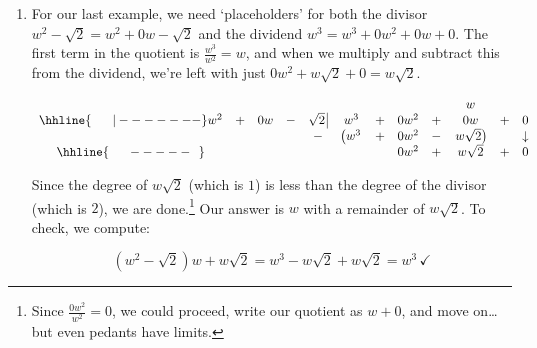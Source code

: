 {\begin{enumerate}
\item For our last example, we need `placeholders' for both the divisor  $w^2 - \sqrt{2} = w^2 + 0w -\sqrt{2}$ and the dividend $w^3 = w^3 + 0w^2 + 0w + 0$.  The first term in the quotient is $\frac{w^3}{w^2} = w$, and when we multiply and subtract this from the dividend, we're left with just $0w^2 + w\sqrt{2} + 0 = w\sqrt{2}$.

\setlength\arraycolsep{0.1pt}
\setlength\extrarowheight{2pt}

\[ \begin{array}{cccccccccccc}

    &   &    &   &                    &     &   &      &   &  w &   & \\ \hhline{~~~~~|-------}

w^2 & + & 0w & - & \sqrt{2} \, \vline & w^3 & + & 0w^2 & + & 0w & + & 0  \\
    
		&   &    &    &                  -&\left(w^3\vphantom{w\sqrt{2}} \right. & + & 0w^2 & - & \left.  w\sqrt{2} \right) & & \downarrow \\ \hhline{~~~~~-----~~}
    &   &    &    &                   &                                       &  &  0w^2     &  + &   w\sqrt{2}  & + & 0\\ 
 
\end{array}\]
\setlength\arraycolsep{5pt}
\setlength\extrarowheight{0pt}

Since the degree of $w\sqrt{2}$ (which is $1$) is less than the degree of the divisor (which is $2$), we are done.\footnote{Since $\frac{0w^2}{w^2} = 0$, we could proceed, write our quotient as $w+0$, and move on\ldots but even pedants have limits.}  Our answer is $w$ with a remainder of $w \sqrt{2}$.  To check, we compute:

\[ \left(w^2 - \sqrt{2}\right)w + w\sqrt{2} = w^3 - w\sqrt{2} + w\sqrt{2} = w^3 \, \checkmark\]

\end{enumerate}
}

